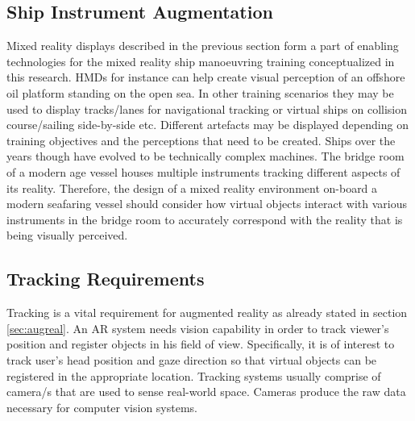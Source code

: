 

\subsection{Ship Instrument Augmentation}

Mixed reality displays described in the previous section form a part of enabling technologies for the mixed reality ship manoeuvring training conceptualized in this research. HMDs for instance can help create visual perception of an offshore oil platform standing on the open sea. In other training scenarios they may be used to display tracks/lanes for navigational tracking or virtual ships on collision course/sailing side-by-side etc. Different artefacts may be displayed depending on training objectives and the perceptions that need to be created. Ships over the years though have evolved to be technically complex machines. The bridge room of a modern age vessel houses multiple instruments tracking different aspects of its reality. Therefore, the design of a mixed reality environment on-board a modern seafaring vessel should consider how virtual objects interact with various instruments in the bridge room to accurately correspond with the reality that is being visually perceived.  
%
%

\subsection{Tracking Requirements}
Tracking is a vital requirement for augmented reality as already stated in section \ref{sec:augreal}. An AR system needs vision capability in order to track viewer’s position and register objects in his field of view. Specifically, it is of interest to track user's head position and gaze direction so that virtual objects can be registered in the appropriate location. Tracking systems usually comprise of camera/s that are used to sense real-world space. Cameras produce the raw data necessary for computer vision systems.   

